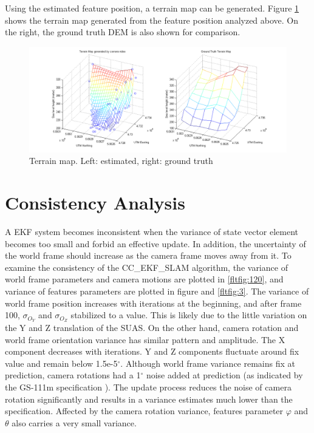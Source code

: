 Using the estimated feature position, a terrain map can be generated.
Figure \ref{fltfig:10} shows the terrain map generated from the
feature position analyzed above. On the right, the ground truth DEM is
also shown for comparison. 

\begin{figure}[h]
\centering
\includegraphics[width=14cm, keepaspectratio=true]
{./Figures/fltfig/cut1/terrain/terrain_map_cmp.png}
\caption{Terrain map. Left: estimated, right: ground truth }
\label{fltfig:10}
\end{figure}

\section{Consistency Analysis}
A EKF system becomes inconsistent when the variance of state vector
element becomes too small and forbid an effective update. In addition,
the uncertainty of the world frame should increase as the camera frame
moves away from it. To examine the consistency of the CC\_EKF\_SLAM
algorithm, the variance of world frame parameters and camera motions
are plotted in \ref{fltfig:120}, and variance of features parameters
are plotted in figure and \ref{fltfig:3}. The variance of world frame
position increases with iterations at the beginning, and after frame
100, $\sigma_{O_Y}$ and $\sigma_{O_Z}$ stabilized to a value. This is
likely due to the little variation on the Y and Z translation of the
SUAS. On the other hand, camera rotation and world frame orientation
variance has similar pattern and amplitude. The X component decreases
with iterations. Y and Z components fluctuate around fix value and
remain below 1.5e-5$^\circ$. Although world frame variance remains fix
at prediction, camera rotations had a 1$^\circ$ noise added at
prediction (as indicated by the GS-111m specification
\cite{_athena_????}). The update process reduces the noise of camera
rotation significantly and results in a variance estimates much lower
than the specification. Affected by the camera rotation variance,
features parameter $\varphi$ and $\theta$ also carries a very small
variance.


